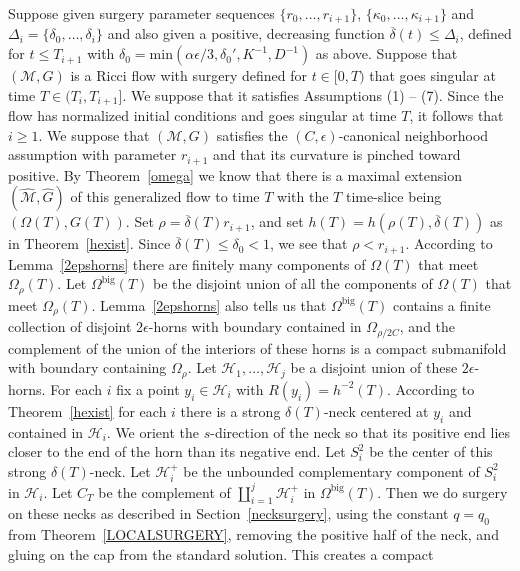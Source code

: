 Suppose given surgery parameter sequences $\{r_0,\ldots,r_{i+1}\}$,
$\{\kappa_0,\ldots,\kappa_{i+1}\}$ and
$\Delta_i=\{\delta_0,\ldots,\delta_i\}$ and also given a positive,
decreasing function $\overline\delta(t)\le \Delta_i$, defined for
$t\le T_{i+1}$ with $\delta_0=\mathrm{min}(\alpha\epsilon/3,\delta_0',K^{-1},D^{-1})$ as above. Suppose
that $({\mathcal M},G)$ is a Ricci flow with surgery defined for
$t\in [0,T)$ that goes singular at time $T\in (T_i,T_{i+1}]$. We
suppose that it satisfies Assumptions (1) -- (7). Since the flow has
normalized initial conditions and goes singular at time $T$, it
follows that $i\ge 1$. We suppose that $({\mathcal M},G)$ satisfies
the $(C,\epsilon)$-canonical neighborhood assumption with parameter
$r_{i+1}$ and that its curvature is pinched toward positive. By
Theorem~\ref{omega} we know that there is a maximal extension
$(\widehat{\mathcal M},\widehat G)$ of this generalized flow to time
$T$ with the $T$ time-slice being $(\Omega(T),G(T))$. Set
$\rho=\overline\delta(T)r_{i+1}$, and set
$h(T)=h(\rho(T),\overline\delta(T))$ as in Theorem~\ref{hexist}.
Since $\overline\delta(T)\le \delta_0<1$, we see that
$\rho<r_{i+1}$. According to Lemma~\ref{2epshorns} there are
finitely many components of $\Omega(T)$ that meet $\Omega_\rho(T)$.
Let $\Omega^\mathrm{big}(T)$ be the disjoint union of all the
components of $\Omega(T)$ that meet $\Omega_\rho(T)$.
Lemma~\ref{2epshorns} also tells us that $\Omega^\mathrm{big}(T)$
contains a finite collection of disjoint $2\epsilon$-horns with
boundary contained in $\Omega_{\rho/2C}$, and the complement of the
union of the interiors of these horns is a compact submanifold with
boundary containing $\Omega_\rho$.  Let ${\mathcal
H}_1,\ldots,{\mathcal H}_j$ be a disjoint union of these
$2\epsilon$-horns. For each $i$ fix a point $y_i\in {\mathcal H}_i$
with $R(y_i)=h^{-2}(T)$. According to Theorem~\ref{hexist} for each
$i$ there is a strong $\delta(T)$-neck centered at $y_i$ and
contained in ${\mathcal H}_i$.
 We orient the $s$-direction of the
neck so that its positive end lies closer to the end of the horn
than its negative end. Let $S^2_i$ be the center of this strong
$\delta(T)$-neck. Let ${\mathcal H}_i^+$ be the unbounded
complementary component of $S^2_i$ in ${\mathcal H}_i$. Let $C_T$ be
the complement of $\coprod_{i=1}^j{\mathcal H}^+_i$ in $\Omega^\mathrm{big}(T)$. Then we do surgery on these necks as described in
Section~\ref{necksurgery}, using the constant $q=q_0$ from
Theorem~\ref{LOCALSURGERY},
 removing the positive half of the neck,
and gluing on the cap from the standard solution. This creates a compact
